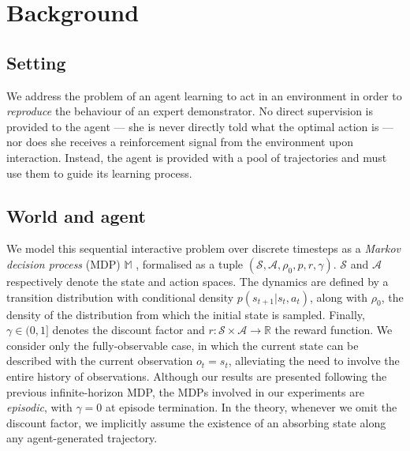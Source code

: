 \section{Background}

\subsection*{Setting}

We address the problem of an agent learning to act in an environment in order
to \emph{reproduce} the behaviour of an expert demonstrator.
No direct supervision is provided to the agent --- she is never directly told
what the optimal action is --- nor does she receives a reinforcement signal
from the environment upon interaction.
Instead, the agent is provided with a pool of trajectories and must use them to
guide its learning process.

\subsection*{World and agent}

We model this sequential interactive problem over discrete timesteps as a
\textit{Markov decision process} (MDP) $\mathbb{M}$ \cite{Puterman1994-pf},
formalised as a tuple
$(\mathcal{S}, \mathcal{A}, \rho_0, p, r, \gamma)$.
$\mathcal{S}$ and $\mathcal{A}$ respectively denote the state and action
spaces.
The dynamics are defined by a transition distribution with conditional
density $p(s_{t+1} | s_t, a_t)$, along with $\rho_0$, the density
of the distribution from which the initial state is sampled.
Finally, $\gamma \in (0, 1]$ denotes the discount factor and
$r: \mathcal{S} \times \mathcal{A} \rightarrow \mathbb{R}$ the reward function.
We consider only the fully-observable case, in which the current state can be
described with the current observation $o_t = s_t$, alleviating the need to
involve the entire history of observations.
Although our results are presented following the previous infinite-horizon MDP,
the MDPs involved in our experiments are \textit{episodic},
with $\gamma = 0$ at episode termination.
In the theory, whenever we omit the discount factor, we implicitly assume the
existence of an absorbing state along any agent-generated trajectory.

